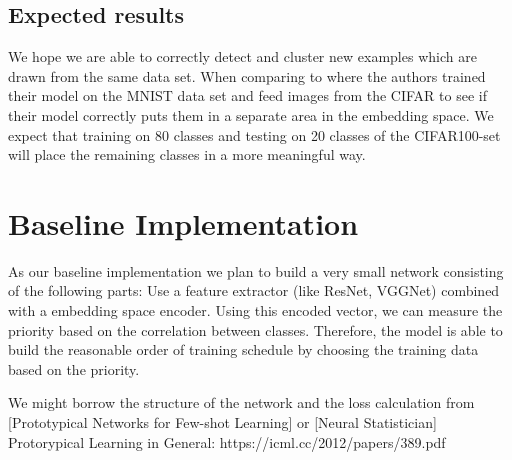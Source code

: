 \subsection{Expected results}
We hope we are able to correctly detect and cluster new examples which are drawn from the same data set. When comparing to \cite{yang2018robust} where the authors trained their model on the MNIST data set and feed images from the CIFAR to see if their model correctly puts them in a separate area in the embedding space. We expect that training on 80 classes and testing on 20 classes of the CIFAR100-set will place the remaining classes in a more meaningful way. 

\section{Baseline Implementation}

As our baseline implementation we plan to build a very small network consisting of the following parts: Use a feature extractor (like ResNet, VGGNet) combined with a embedding space encoder. Using this encoded vector, we can measure the priority based on the correlation between classes. 
Therefore, the model is able to build the reasonable order of training schedule by choosing the training data based on the priority. 

We might borrow the structure of the network and the loss calculation from [Prototypical Networks for Few-shot Learning] or [Neural Statistician]
Protorypical Learning in General: https://icml.cc/2012/papers/389.pdf
